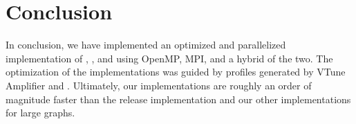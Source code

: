 \section{Conclusion}\label{sec:conclusion}
In conclusion, we have implemented an optimized and parallelized implementation
of \rs{}, \block{}, and \fw{} using OpenMP, MPI, and a hybrid of the two. The
optimization of the implementations was guided by profiles generated by VTune
Amplifier and \icc{}. Ultimately, our \block{} implementations are roughly an
order of magnitude faster than the release implementation and our other
implementations for large graphs.
